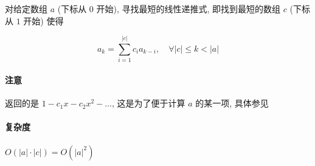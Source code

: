 对给定数组 \(a\) (下标从 \(0\) 开始), 寻找最短的线性递推式, 即找到最短的数组 \(c\) (下标从 \(1\) 开始) 使得

\[
    a_k=\sum_{i=1}^{|c|} c_i a_{k-i},\quad \forall |c|\leq k < |a|
\]

\paragraph{注意}

返回的是 \(1-c_1 x -c_2 x^2-\dots\), 这是为了便于计算 \(a\) 的某一项, 具体参见 

\paragraph{复杂度} \(O(|a|\cdot |c|)=O\left(|a|^2\right)\)

